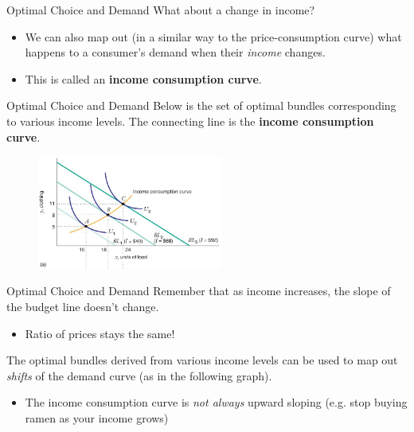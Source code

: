 \documentclass[11pt,t]{beamer}
\begin{document}
\begin{frame}{Optimal Choice and Demand}
  What about a change in income?
  \begin{itemize}
    \item We can also map out (in a similar way to the price-consumption curve) what happens to a consumer's demand when their \emph{income} changes.

    \item This is called an \textbf{income consumption curve}.
  \end{itemize}
\end{frame}

\begin{frame}{Optimal Choice and Demand}
Below is the set of optimal bundles corresponding to various income levels. The connecting line is the \textbf{income consumption curve}.
\begin{figure}
  \includegraphics[width=230px]{figures/fig5_2a.jpg}
\end{figure}
\end{frame}

\begin{frame}{Optimal Choice and Demand}
  Remember that as income increases, the slope of the budget line doesn't change. 

  \begin{itemize}
    \item Ratio of prices stays the same!
  \end{itemize}

  \bigskip\pause
  The optimal bundles derived from various income levels can be used to map out \textit{shifts} of the demand curve (as in the following graph).
  
  \begin{itemize}
    \item The income consumption curve is \textit{not always} upward sloping (e.g. stop buying ramen as your income grows)
  \end{itemize}
\end{frame}
\end{document}

